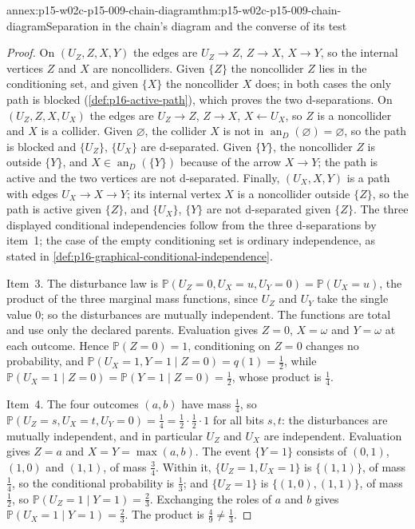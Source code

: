 \begin{annexitem}{annex:p15-w02c-p15-009-chain-diagram}{thm:p15-w02c-p15-009-chain-diagram}{Separation in the chain's diagram and the converse of its test}
\begin{proof}
On \((U_Z,Z,X,Y)\) the edges are \(U_Z\to Z\), \(Z\to X\), \(X\to Y\),
so the internal vertices \(Z\) and \(X\) are noncolliders. Given
\(\{Z\}\) the noncollider \(Z\) lies in the conditioning set, and given
\(\{X\}\) the noncollider \(X\) does; in both cases the only path is
blocked (\cref{def:p16-active-path}), which proves the two
d-separations. On \((U_Z,Z,X,U_X)\) the edges are \(U_Z\to Z\),
\(Z\to X\), \(X\leftarrow U_X\), so \(Z\) is a noncollider and \(X\) is
a collider. Given \(\varnothing\), the collider \(X\) is not in
\(\operatorname{an}_D(\varnothing)=\varnothing\), so the path is blocked
and \(\{U_Z\}\), \(\{U_X\}\) are d-separated. Given \(\{Y\}\), the
noncollider \(Z\) is outside \(\{Y\}\), and
\(X\in\operatorname{an}_D(\{Y\})\) because of the arrow \(X\to Y\); the
path is active and the two vertices are not d-separated. Finally,
\((U_X,X,Y)\) is a path with edges \(U_X\to X\to Y\); its internal
vertex \(X\) is a noncollider outside \(\{Z\}\), so the path is active
given \(\{Z\}\), and \(\{U_X\}\), \(\{Y\}\) are not d-separated given
\(\{Z\}\). The three displayed conditional independencies follow from
the three d-separations by item~1; the case of the empty conditioning set
is ordinary independence, as stated in
\cref{def:p16-graphical-conditional-independence}.

Item~3. The disturbance law is
\(\mathbb P(U_Z=0,U_X=u,U_Y=0)=\mathbb P(U_X=u)\), the product of the
three marginal mass functions, since \(U_Z\) and \(U_Y\) take the single
value \(0\); so the disturbances are mutually independent. The
functions are total and use only the declared parents. Evaluation gives
\(Z=0\), \(X=\omega\) and \(Y=\omega\) at each outcome. Hence
\(\mathbb P(Z=0)=1\), conditioning on \(Z=0\) changes no probability,
and \(\mathbb P(U_X=1,Y=1\mid Z=0)=q(1)=\tfrac12\), while
\(\mathbb P(U_X=1\mid Z=0)=\mathbb P(Y=1\mid Z=0)=\tfrac12\), whose
product is \(\tfrac14\).

Item~4. The four outcomes \((a,b)\) have mass \(\tfrac14\), so
\(\mathbb P(U_Z=s,U_X=t,U_Y=0)=\tfrac14=\tfrac12\cdot\tfrac12\cdot1\)
for all bits \(s,t\): the disturbances are mutually independent, and in
particular \(U_Z\) and \(U_X\) are independent. Evaluation gives
\(Z=a\) and \(X=Y=\max(a,b)\). The event \(\{Y=1\}\) consists of
\((0,1)\), \((1,0)\) and \((1,1)\), of mass \(\tfrac34\). Within it,
\(\{U_Z=1,U_X=1\}\) is \(\{(1,1)\}\), of mass \(\tfrac14\), so the
conditional probability is \(\tfrac13\); and \(\{U_Z=1\}\) is
\(\{(1,0),(1,1)\}\), of mass \(\tfrac12\), so
\(\mathbb P(U_Z=1\mid Y=1)=\tfrac23\). Exchanging the roles of \(a\) and
\(b\) gives \(\mathbb P(U_X=1\mid Y=1)=\tfrac23\). The product is
\(\tfrac49\ne\tfrac13\).


\end{proof}
\end{annexitem}
